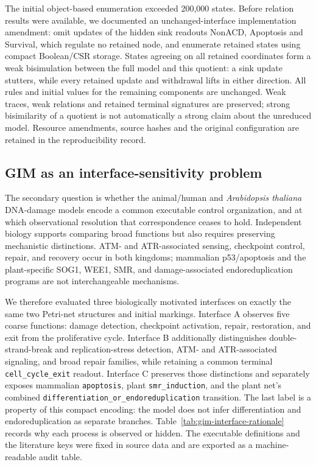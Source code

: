 \documentclass{ws-jbcb}
\numberwithin{equation}{section}
\newcommand{\tas}{\textit{Arabidopsis thaliana}}
\begin{document}
The initial object-based enumeration exceeded 200,000 states. Before relation
results were available, we documented an unchanged-interface implementation
amendment: omit updates of the hidden sink readouts NonACD, Apoptosis and
Survival, which regulate no retained node, and enumerate retained states using
compact Boolean/CSR storage. States agreeing on all retained coordinates form
a weak bisimulation between the full model and this quotient: a sink update
stutters, while every retained update and withdrawal lifts in either direction.
All rules and initial values for the remaining components are unchanged.
Weak traces, weak relations and retained terminal signatures are preserved;
strong bisimilarity of a quotient is not automatically a strong claim about
the unreduced model. Resource amendments, source hashes and the original
configuration are retained in the reproducibility record.

\subsection{GIM as an interface-sensitivity problem}
\label{sec:gim-question}

The secondary question is whether the animal/human and \tas{} DNA-damage models
encode a common executable control organization, and at which observational
resolution that correspondence ceases to hold. Independent biology supports
comparing broad functions but also requires preserving mechanistic distinctions.
ATM- and ATR-associated sensing, checkpoint control, repair, and recovery occur
in both kingdoms; mammalian p53/apoptosis and the plant-specific SOG1, WEE1, SMR,
and damage-associated endoreduplication programs are not interchangeable
mechanisms.\cite{JacksonBartek2009,BlackfordJackson2017,Yoshiyama2013,
DeSchutter2007,Yi2014,Adachi2011,Ogita2018,ManovaGruszka2015}

We therefore evaluated three biologically motivated interfaces on exactly the
same two Petri-net structures and initial markings. Interface A observes five
coarse functions: damage detection, checkpoint activation, repair, restoration,
and exit from the proliferative cycle. Interface B additionally distinguishes
double-strand-break and replication-stress detection, ATM- and ATR-associated
signaling, and broad repair families, while retaining a common terminal
\texttt{cell\_cycle\_exit} readout. Interface C preserves those distinctions and
separately exposes mammalian \texttt{apoptosis}, plant
\texttt{smr\_induction}, and the plant net's combined
\texttt{differentiation\_or\_endoreduplication} transition. The last label is a
property of this compact encoding: the model does not infer differentiation and
endoreduplication as separate branches. Table~\ref{tab:gim-interface-rationale}
records why each process is observed or hidden. The executable definitions and
the literature keys were fixed in source data and are exported as a
machine-readable audit table.
\end{document}
